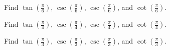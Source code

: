 \begin{exc}
  \label{exc:find_tan_sec_csc_cot_1}

  Find $\tan \left(\frac{\pi}{6}\right)$, $\csc \left(\frac{\pi}{6}\right)$,
  $\csc \left(\frac{\pi}{6}\right)$, and $\cot \left(\frac{\pi}{6}\right)$.
\end{exc}

\begin{exc}
  \label{exc:find_tan_sec_csc_cot_2}

  Find $\tan \left(\frac{\pi}{4}\right)$, $\csc \left(\frac{\pi}{4}\right)$,
  $\csc \left(\frac{\pi}{4}\right)$, and $\cot \left(\frac{\pi}{4}\right)$.
\end{exc}

\begin{exc}
  \label{exc:find_tan_sec_csc_cot_3}

  Find $\tan \left(\frac{\pi}{3}\right)$, $\csc \left(\frac{\pi}{3}\right)$,
  $\csc \left(\frac{\pi}{3}\right)$, and $\cot \left(\frac{\pi}{3}\right)$.
\end{exc}

\newpage
